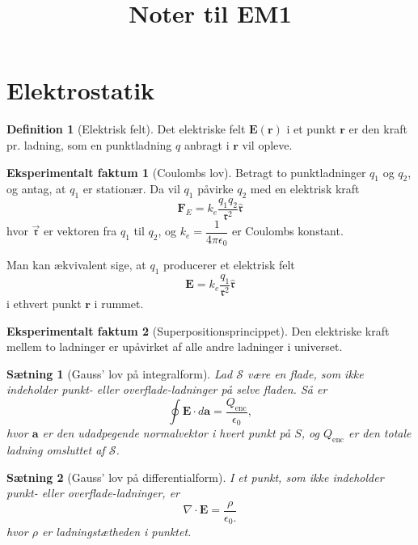 \documentclass[]{article}
\title{Noter til EM1}
\newcommand{\fr}{\mathfrak{r}}
\newcommand{\vfr}{\vec{\mathfrak{r}}}
\newcommand{\hfr}{\hat{\mathfrak{r}}}
\newtheorem{theorem}{Sætning}
\theoremstyle{definition}
\newtheorem{definition}{Definition}
\newtheorem{experimental}{Eksperimentalt faktum}
\newcommand{\Qenc}{Q_\text{enc}}
\begin{document}
\maketitle

\section{Elektrostatik}

\begin{definition}[Elektrisk felt]
	Det elektriske felt $ \mathbf{E}(\mathbf{r})$ i et punkt $\mathbf{r}$ er den kraft pr. ladning, som en punktladning $q$ anbragt i $\mathbf{r} $ vil opleve.
\end{definition}

\begin{experimental}[Coulombs lov]
	Betragt to punktladninger $q_1$ og $q_2$, og antag, at $q_1$ er stationær. Da vil $q_1$ påvirke $q_2$ med en elektrisk kraft
	\begin{equation*}
		\mathbf{F}_E = k_e \dfrac{q_1 q_2}{\fr^2} \hfr
	\end{equation*}
	hvor $\vfr$ er vektoren fra $q_1$ til $q_2$, og $k_e = \dfrac{1}{4\pi \epsilon_0}$ er Coulombs konstant.
	
	Man kan ækvivalent sige, at $q_1$ producerer et elektrisk felt
	\begin{equation*}
		\mathbf{E} = k_e \dfrac{q_1}{\fr^2} \hfr
	\end{equation*}
	i ethvert punkt $\mathbf{r}$ i rummet.
\end{experimental}

\begin{experimental}[Superpositionsprincippet]
	Den elektriske kraft mellem to ladninger er upåvirket af alle andre ladninger i universet.
\end{experimental}


\begin{theorem}[Gauss' lov på integralform]
	Lad $\mathcal{S}$ være en flade, som ikke indeholder punkt- eller overflade-ladninger på selve fladen. Så er
	\begin{equation*}
		\oint \mathbf{E} \cdot d \mathbf{a} = \frac{\Qenc}{\epsilon_0}, 
	\end{equation*}
	hvor $\mathbf{a}$ er den udadpegende normalvektor i hvert punkt på $S$, og $\Qenc$ er den totale ladning omsluttet af $\mathcal{S}$.
\end{theorem}

\begin{theorem}[Gauss' lov på differentialform]
	I et punkt, som ikke indeholder punkt- eller overflade-ladninger, er
	\begin{equation*}
		\nabla \cdot \mathbf{E} = \dfrac{\rho}{\epsilon_0.}
	\end{equation*}
	hvor $\rho$ er ladningstætheden i punktet.
\end{theorem}
\end{document}
